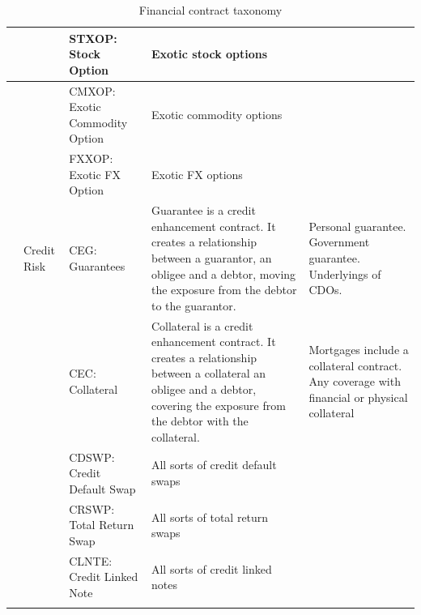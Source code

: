 \documentclass[9pt,oneside]{amsart}
\begin{document}
\begin{longtable}{| p{}p{}p{}p{}p{} |}
	\hline 
	 & & STXOP: Stock Option & Exotic stock options &  \\
	\hline 
	 & & CMXOP: Exotic Commodity Option & Exotic commodity options & \\
	\hline 
	 & & FXXOP: Exotic FX Option & Exotic FX options & \\
	\hline 
	 & Credit Risk & CEG: Guarantees & Guarantee is a credit enhancement contract. It creates a relationship between a guarantor, an obligee and a debtor, moving the exposure from the debtor to the guarantor. & Personal guarantee. Government guarantee. Underlyings of CDOs. \\
	\hline 
	 & & CEC: Collateral & Collateral is a credit enhancement contract. It creates a relationship between a collateral an obligee and a debtor, covering the exposure from the debtor with the collateral. & Mortgages include a collateral contract. Any coverage with financial or physical collateral \\
	\hline 
	 & & CDSWP: Credit Default Swap & All sorts of credit default swaps &  \\
	\hline 
	 & & CRSWP: Total Return Swap & All sorts of total return swaps & \\
	\hline 
	 & & CLNTE: Credit Linked Note & All sorts of credit linked notes & \\
	\hline
	\caption{Financial contract taxonomy}
	\label{tbl:taxonomy}
\end{longtable}
\end{document}
